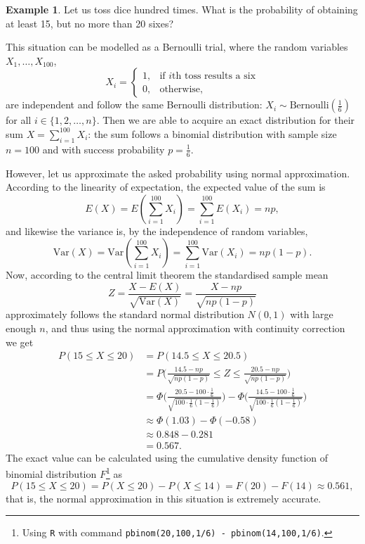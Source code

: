 \documentclass[12pt,a4paper,leqno]{report}
\newcommand{\var}{\mathrm{Var}}
\theoremstyle{plain}
\theoremstyle{definition}
\newtheorem{esim}[equation]{Example}
\begin{document}
\begin{esim}
Let us toss dice hundred times. What is the probability of obtaining at least 15, but no more than 20 sixes?

This situation can be modelled as a Bernoulli trial, where the random variables $X_1, \dots , X_{100}$,
\[
X_i = \begin{cases}
1, &\text{if} \,\,i\text{th toss results a six} \\
0, &\text{otherwise},
\end{cases}
\]
are independent and follow the same Bernoulli distribution: $X_i \sim \text{Bernoulli}(\frac{1}{6})$ for all $i \in \{1,2, \dots, n\}$. Then we are able to acquire an exact distribution for their sum $X = \sum_{i=1}^{100} X_i$: the sum follows a binomial distribution with sample size $n=100$ and with success probability $p = \frac{1}{6}$.

However, let us approximate the asked probability using normal approximation. According to the linearity of expectation, the expected value of the sum is
\[
E(X) = E\left(\sum_{i=1}^{100} X_i \right) = \sum_{i=1}^{100} E(X_i) = np,
\]
and likewise the variance is, by the independence of random variables,
\[
\var(X) = \var\left(\sum_{i=1}^{100} X_i\right) = \sum_{i=1}^{100} \var(X_i) = np(1-p).
\]
Now, according to the central limit theorem the standardised sample mean
\[
Z = \frac{X - E(X)}{\sqrt{\var(X)}} = \frac{X - np}{\sqrt{np(1-p)}}
\]
approximately follows the standard normal distribution $N(0,1)$ with large enough $n$, and thus using the normal approximation with continuity correction we get
\[
\begin{split}
P(15 \leq X \leq 20) &= P(14.5 \leq X \leq 20.5) \\
	&= P\Big(\frac{14.5 - np}{\sqrt{np(1-p)}} \leq Z \leq \frac{20.5 - np}{\sqrt{np(1-p)}}\Big) \\
	&=\Phi \Big( \frac{20.5 - 100 \cdot \frac{1}{6}}{\sqrt{100 \cdot \frac{1}{6}(1-\frac{1}{6})}}\Big) - \Phi\Big(\frac{14.5 - 100 \cdot \frac{1}{6}}{\sqrt{100 \cdot \frac{1}{6}(1-\frac{1}{6})}}\Big)  \\
	&\approx \Phi(1.03) - \Phi(-0.58) \\
	&\approx  0.848 - 0.281 \\									  					&= 0.567.
\end{split}
\]
The exact value can be calculated using the cumulative density function of binomial distribution $F$\footnote{Using \texttt{R} with command \texttt{pbinom(20,100,1/6) - pbinom(14,100,1/6)}.} as
\[
P(15 \leq X \leq 20) = P(X \leq 20) - P(X \leq 14) = F(20) - F(14) \approx 0.561,
\]
that is, the normal approximation in this situation is extremely accurate.
\end{esim}
\end{document}
